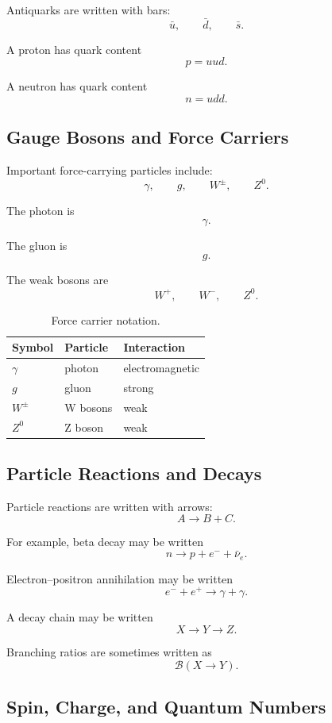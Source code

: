 \documentclass[11pt,twocolumn]{article}
\begin{document}
Antiquarks are written with bars:
\[
\bar{u},
\qquad
\bar{d},
\qquad
\bar{s}.
\]

A proton has quark content
\[
p = uud.
\]

A neutron has quark content
\[
n = udd.
\]

\subsection{Gauge Bosons and Force Carriers}

Important force-carrying particles include:
\[
\gamma,
\qquad
g,
\qquad
W^\pm,
\qquad
Z^0.
\]

The photon is
\[
\gamma.
\]

The gluon is
\[
g.
\]

The weak bosons are
\[
W^+,
\qquad
W^-,
\qquad
Z^0.
\]

\begin{table}[ht]
\centering
\small
\caption{Force carrier notation.}
\begin{tabular}{lll}
\toprule
Symbol & Particle & Interaction \\
\midrule
\(\gamma\) & photon & electromagnetic \\
\(g\) & gluon & strong \\
\(W^\pm\) & W bosons & weak \\
\(Z^0\) & Z boson & weak \\
\bottomrule
\end{tabular}
\end{table}

\subsection{Particle Reactions and Decays}

Particle reactions are written with arrows:
\[
A \to B + C.
\]

For example, beta decay may be written
\[
n
\to
p + e^- + \bar{\nu}_e.
\]

Electron--positron annihilation may be written
\[
e^- + e^+
\to
\gamma + \gamma.
\]

A decay chain may be written
\[
X \to Y \to Z.
\]

Branching ratios are sometimes written as
\[
\mathcal{B}(X\to Y).
\]

\subsection{Spin, Charge, and Quantum Numbers}
\end{document}
